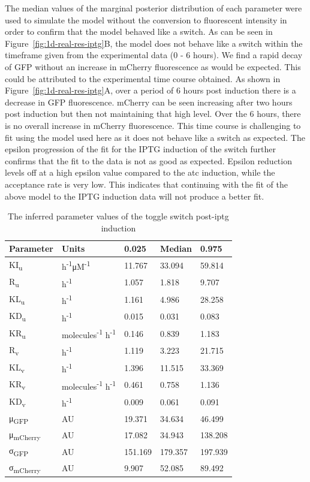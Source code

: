 The median values of the marginal posterior distribution of each parameter were used to simulate the model without the conversion to fluorescent intensity in order to confirm that the model behaved like a switch. As can be seen in Figure~\ref{fig:1d-real-res-iptg}B, the model does not behave like a switch within the timeframe given from the experimental data (0 - 6 hours). We find a rapid decay of GFP without an increase in mCherry fluorescence as would be expected. This could be attributed to the experimental time course obtained. As shown in Figure~\ref{fig:1d-real-res-iptg}A, over a period of 6 hours post induction there is a decrease in GFP fluorescence. mCherry can be seen increasing after two hours post induction but then not maintaining that high level. Over the 6 hours, there is no overall increase in mCherry fluorescence. This time course is challenging to fit using the model used here as it does not behave like a switch as expected. The epsilon progression of the fit for the IPTG induction of the switch further confirms that the fit to the data is not as good as expected. Epsilon reduction levels off at a high epsilon value compared to the \acrshort{atc} induction, while the acceptance rate is very low. This indicates that continuing with the fit of the above model to the IPTG induction data will not produce a better fit.   


\begin{table}[tb]
\centering
\caption{The inferred parameter values of the toggle switch post-\acrshort{iptg} induction}
\label{tab:inf_params_iptg}
\begin{tabular}{@{}lllll@{}}
\toprule
Parameter & Units &0.025 & Median & 0.975 \\ \midrule
KI\textsubscript{u} &h\textsuperscript{-1}μM\textsuperscript{-1}& 11.767 & 33.094 & 59.814 \\
R\textsubscript{u} & h\textsuperscript{-1}& 1.057 & 1.818 & 9.707 \\
KL\textsubscript{u} &h\textsuperscript{-1}& 1.161 & 4.986 & 28.258 \\
KD\textsubscript{u} &h\textsuperscript{-1}& 0.015 & 0.031 & 0.083 \\
KR\textsubscript{u} &molecules\textsuperscript{-1} h\textsuperscript{-1}& 0.146 & 0.839 & 1.183 \\
R\textsubscript{v} & h\textsuperscript{-1}& 1.119 & 3.223 & 21.715 \\
KL\textsubscript{v} &h\textsuperscript{-1}& 1.396 & 11.515 & 33.369 \\
KR\textsubscript{v} &molecules\textsuperscript{-1} h\textsuperscript{-1}& 0.461 & 0.758 & 1.136 \\
KD\textsubscript{v} &h\textsuperscript{-1}& 0.009 & 0.061 & 0.091 \\
μ\textsubscript{GFP} &AU& 19.371 & 34.634 & 46.499 \\
μ\textsubscript{mCherry} &AU& 17.082 & 34.943 & 138.208\\
σ\textsubscript{GFP} &AU& 151.169 & 179.357 & 197.939 \\
σ\textsubscript{mCherry} &AU& 9.907 & 52.085 & 89.492 \\ \bottomrule
\end{tabular}
\end{table}


